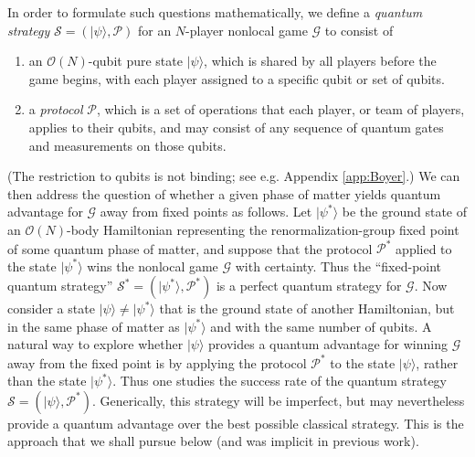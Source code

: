 \documentclass[prb,twocolumn,showpacs,amssymb,superscriptaddress]{revtex4-2}
\begin{document}
In order to formulate such questions mathematically, we define a \emph{quantum strategy} $\mathcal{S} = (|\psi\rangle,\mathcal{P})$ for an $N$-player nonlocal game $\mathcal{G}$ to consist of 
\begin{enumerate}
\item an $\mathcal{O}(N)$-qubit pure state $|\psi\rangle$, which is shared by all players before the game begins, with each player assigned to a specific qubit or set of qubits.
\item a \emph{protocol} $\mathcal{P}$, which is a set of operations that each player, or team of players\cite{companion}, applies to their qubits, and may consist of any sequence of quantum gates and measurements on those qubits.
\end{enumerate}
(The restriction to qubits is not binding\cite{Brassard2005}; see e.g. Appendix \ref{app:Boyer}.) We can then address the question of whether a given phase of matter yields quantum advantage for $\mathcal{G}$ away from fixed points as follows. Let $|\psi^*\rangle$ be the ground state of an $\mathcal{O}(N)$-body Hamiltonian representing the renormalization-group fixed point  of some quantum phase of matter, and suppose that the protocol $\mathcal{P}^*$ applied to the state $|\psi^*\rangle$ wins the nonlocal game $\mathcal{G}$ with certainty.  Thus the ``fixed-point quantum strategy'' $\mathcal{S}^* = (|\psi^*\rangle,\mathcal{P}^*)$ is a perfect quantum strategy\cite{brassard2005recasting} for $\mathcal{G}$.  Now consider a state $|\psi\rangle \neq |\psi^*\rangle$ that is the ground state of another Hamiltonian, but in the same phase of matter as $|\psi^*\rangle$ and with the same number of qubits. A natural way to explore whether $|\psi\rangle$ provides a quantum advantage for winning $\mathcal{G}$ away from the fixed point is by applying the protocol $\mathcal{P}^*$ to the state $|\psi\rangle$, rather than the state $|\psi^*\rangle$. Thus one studies the success rate of the quantum strategy $\mathcal{S} = (|\psi\rangle, \mathcal{P}^*)$. Generically, this strategy will be imperfect,  but may nevertheless provide a quantum advantage over the best possible classical strategy.  This is the approach that we shall pursue below (and was implicit in previous work\cite{DanielMiyake}).
\end{document}

